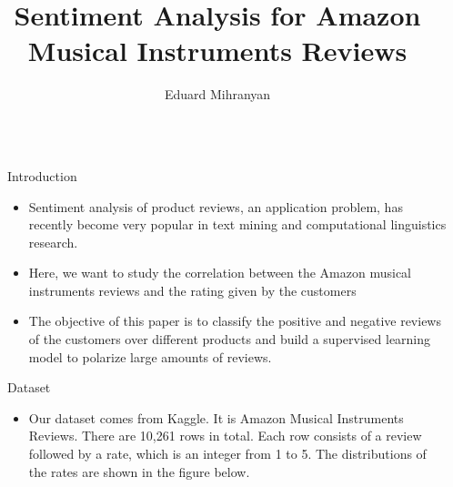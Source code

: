 \documentclass[final]{beamer}
\title{Sentiment Analysis for Amazon Musical Instruments Reviews} %
\author{Eduard Mihranyan} %
\newlength{\sepwid}
\newlength{\onecolwid}
\begin{document}

\setlength{\belowcaptionskip}{2ex} %
\setlength\belowdisplayshortskip{2ex} %

\begin{frame}[t] %

\begin{columns}[t] %

\begin{column}{\sepwid}\end{column} %

\begin{column}{\onecolwid} %


\begin{block}{Introduction}
\begin{itemize}
\item Sentiment analysis of product reviews, an application problem, has recently become very popular in text mining and computational linguistics research.
\item Here, we want to study the correlation between the Amazon musical instruments reviews and the rating given by the customers
\item The objective of this paper is to classify the positive and negative reviews of the customers over different products and build a supervised learning model to polarize large amounts of reviews.

\end{itemize}
\end{block}


\begin{block}{Dataset}
\begin{itemize}


\item Our dataset comes from Kaggle. It is Amazon Musical Instruments Reviews. There are 10,261 rows in total. Each row consists of a review followed by a rate, which is an integer from 1 to 5. The distributions of the rates are shown in the figure below. 


\end{itemize}
\end{block}
\end{column}
\end{columns}
\end{frame}
\end{document}
